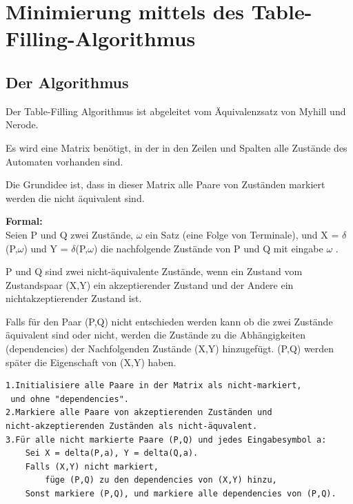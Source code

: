 \section{Minimierung mittels des
Table-Filling-Algorithmus}

\subsection{Der Algorithmus}
Der Table-Filling Algorithmus\cite{minimization1,minimization2,minimization3} ist abgeleitet
 vom Äquivalenzsatz von Myhill und Nerode. 

Es wird eine Matrix benötigt, in der in den Zeilen und Spalten alle Zustände des
Automaten vorhanden sind.

Die Grundidee ist, dass in dieser Matrix alle Paare von Zuständen markiert
werden die nicht äquivalent sind.

{\bf Formal: \\}
Seien P und Q zwei Zustände, $\omega$ ein Satz (eine Folge von Terminale), und X
= $\delta$(P,$\omega$) und Y = $\delta$(P,$\omega$) die nachfolgende Zustände von P und Q mit eingabe
$\omega$ .

P und Q sind zwei nicht-äquivalente Zustände, wenn ein Zustand vom
Zustandspaar (X,Y) ein akzeptierender Zustand und der Andere ein
nichtakzeptierender Zustand ist.

Falls für den Paar (P,Q) nicht entschieden werden kann ob die zwei Zustände
äquivalent sind oder nicht, werden die Zustände zu die Abhängigkeiten
(dependencies) der Nachfolgenden Zustände (X,Y) hinzugefügt. (P,Q) werden
später die Eigenschaft von (X,Y) haben.

\lstset{language=C, basicstyle=\footnotesize}
\begin{lstlisting}[float=h!, frame=tb, captionpos=b,
caption={Table-Filling-Algorithmus : Pseudocode}, label=list:TablefillingCode]
1.Initialisiere alle Paare in der Matrix als nicht-markiert,
 und ohne "dependencies".
2.Markiere alle Paare von akzeptierenden Zuständen und 
nicht-akzeptierenden Zuständen als nicht-äquvalent.
3.Für alle nicht markierte Paare (P,Q) und jedes Eingabesymbol a:
	Sei X = delta(P,a), Y = delta(Q,a).
	Falls (X,Y) nicht markiert, 
		füge (P,Q) zu den dependencies von (X,Y) hinzu,
	Sonst markiere (P,Q), und markiere alle dependencies von (P,Q).
	
\end{lstlisting}

